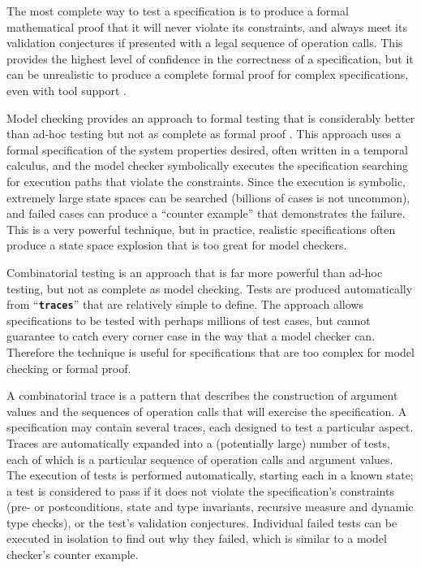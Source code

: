 \documentclass{overturerepchap}
\begin{document}
The most complete way to test a specification is to produce a formal
mathematical proof that it will never violate its constraints, and always meet
its validation conjectures if presented with a legal sequence of operation
calls. This provides the highest level of confidence in the correctness of a
specification, but it can be unrealistic to produce a complete formal proof for
complex specifications, even with tool support \cite{Paulson97,Bicarregui&94}.

Model checking provides an approach to formal testing that is considerably
better than ad-hoc testing but not as complete as formal proof \cite{Clarke&99}. This approach
uses a formal specification of the system properties desired, often written in a
temporal calculus, and the model checker symbolically executes the
specification searching for execution paths that violate the constraints. Since
the execution is symbolic, extremely large state spaces can be searched
(billions of cases is not uncommon), and failed cases can produce a ``counter
example'' that demonstrates the failure. This is a very powerful technique, but
in practice, realistic specifications often produce a state space explosion
that is too great for model checkers.

Combinatorial testing is an approach that is far more powerful than ad-hoc
testing, but not as complete as model checking. Tests are produced automatically
from ``\texttt{\textbf{traces}}'' that are relatively simple to define. The approach allows
specifications to be tested with perhaps millions of test cases, but cannot
guarantee to catch every corner case in the way that a model checker can.
Therefore the technique is useful for specifications that are too complex for
model checking or formal proof.

A combinatorial trace is a pattern that describes the construction of
argument values and the sequences of operation calls that will exercise the
specification. A specification may contain several traces, each designed to test
a particular aspect. Traces are automatically expanded into a (potentially
large) number of tests, each of which is a particular sequence of operation
calls and argument values. The execution of tests is performed
automatically, starting each in a known state; a test is considered to pass if
it does not violate the specification's constraints (pre- or postconditions,
state and type invariants, recursive measure and dynamic type checks), or the
test's validation conjectures. Individual failed tests can be executed in
isolation to find out why they failed, which is similar to a model checker's
counter example.
\end{document}
